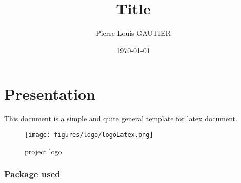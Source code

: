 \documentclass[a4paper, 11pt]{article}
\author{Pierre-Louis GAUTIER}
\title{Title}
\date{\normalsize\today} %
\begin{document}
\maketitle

\newpage
{} %
\tableofcontents

\newpage
\part{Presentation}
This document is a simple and quite general template for \gls{latex} document.

\begin{figure}[H]
    \centering
    \texttt{[image: figures/logo/logoLatex.png]}
    \caption{ project logo}
    \label{fig:latexProject}
\end{figure}

\section{Package used}
\end{document}
